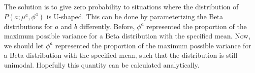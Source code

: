 The solution is to give zero probability to situations where the distribution of $P(a;\mu^a,\phi^a)$ is U-shaped.  This can be done by parameterizing the Beta distributions for $a$ and $b$ differently.  Before, $\phi^a$ represented the proportion of the maximum possible variance for a Beta distribution with the specified mean.  Now, we should let $\phi^a$ represented the proportion of the maximum possible variance for a Beta distribution with the specified mean, such that the distribution is still unimodal.  Hopefully this quantity can be calculated analytically.